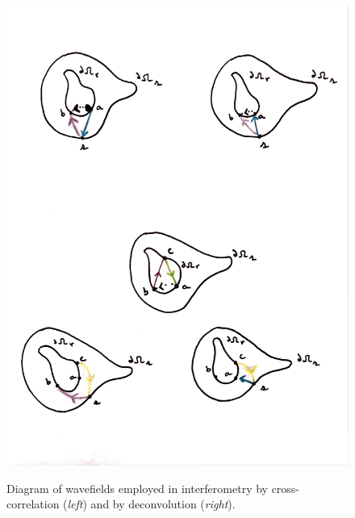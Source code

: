 \documentclass[a4paper,12pt]{article}
\begin{document}
\begin{figure}[!h]
\centering
\includegraphics[trim={10 540 10 50},clip,width=1\textwidth]{../pics/interferometry-diagram.pdf}
\label{fig:ci-di}
\caption{Diagram of wavefields employed in interferometry by cross-correlation ({\it left}) and by deconvolution ({\it right}).}
\end{figure}
\end{document}
